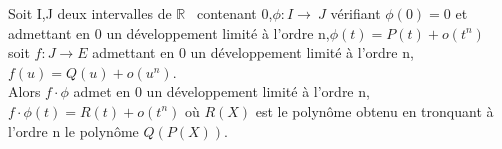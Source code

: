 %
%
%
\begin{thm}
Soit I,J deux intervalles de $\mathbb{R}$~ contenant 0,$ \phi : I \rightarrow~ J$
vérifiant $\phi(0) = 0$ et admettant en 0 un développement limité à l'ordre
n,$ \phi(t) = P(t) + o(t^n)$\\
soit $f : J \rightarrow E$ admettant en 0 un
développement limité à l'ordre n, $f(u) = Q(u) + o(u^n)$. 
\\
Alors $f \cdot \phi$ admet en 0 un développement limité à l'ordre n, $f \cdot \phi(t) = R(t) +
o(t^n)$ où $R(X)$ est le polynôme obtenu en tronquant à l'ordre
n le polynôme $Q(P(X))$.
\end{thm}
%
%
%
